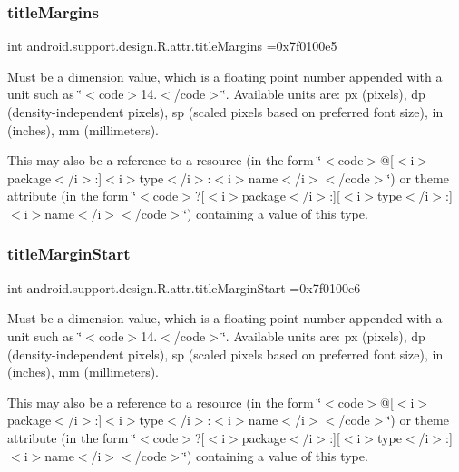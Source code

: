 \subsubsection{\texorpdfstring{title\+Margins}{titleMargins}}
{\footnotesize\ttfamily int android.\+support.\+design.\+R.\+attr.\+title\+Margins =0x7f0100e5\hspace{0.3cm}{\ttfamily [static]}}

Must be a dimension value, which is a floating point number appended with a unit such as \char`\"{}$<$code$>$14.\+5sp$<$/code$>$\char`\"{}. Available units are\+: px (pixels), dp (density-\/independent pixels), sp (scaled pixels based on preferred font size), in (inches), mm (millimeters). 

This may also be a reference to a resource (in the form \char`\"{}$<$code$>$@\mbox{[}$<$i$>$package$<$/i$>$\+:\mbox{]}$<$i$>$type$<$/i$>$\+:$<$i$>$name$<$/i$>$$<$/code$>$\char`\"{}) or theme attribute (in the form \char`\"{}$<$code$>$?\mbox{[}$<$i$>$package$<$/i$>$\+:\mbox{]}\mbox{[}$<$i$>$type$<$/i$>$\+:\mbox{]}$<$i$>$name$<$/i$>$$<$/code$>$\char`\"{}) containing a value of this type. \mbox{\label{classandroid_1_1support_1_1design_1_1R_1_1attr_aadfb6a3ca430a7444ffb6de0d2c8c5d9}} 
\subsubsection{\texorpdfstring{title\+Margin\+Start}{titleMarginStart}}
{\footnotesize\ttfamily int android.\+support.\+design.\+R.\+attr.\+title\+Margin\+Start =0x7f0100e6\hspace{0.3cm}{\ttfamily [static]}}

Must be a dimension value, which is a floating point number appended with a unit such as \char`\"{}$<$code$>$14.\+5sp$<$/code$>$\char`\"{}. Available units are\+: px (pixels), dp (density-\/independent pixels), sp (scaled pixels based on preferred font size), in (inches), mm (millimeters). 

This may also be a reference to a resource (in the form \char`\"{}$<$code$>$@\mbox{[}$<$i$>$package$<$/i$>$\+:\mbox{]}$<$i$>$type$<$/i$>$\+:$<$i$>$name$<$/i$>$$<$/code$>$\char`\"{}) or theme attribute (in the form \char`\"{}$<$code$>$?\mbox{[}$<$i$>$package$<$/i$>$\+:\mbox{]}\mbox{[}$<$i$>$type$<$/i$>$\+:\mbox{]}$<$i$>$name$<$/i$>$$<$/code$>$\char`\"{}) containing a value of this type. \mbox{\label{classandroid_1_1support_1_1design_1_1R_1_1attr_a3e498d603752368ce0e9f7455c87f6cb}} 
